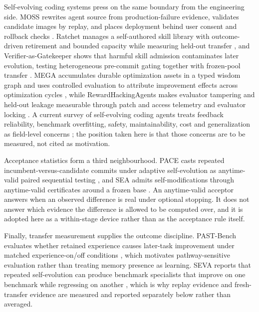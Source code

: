 Self-evolving coding systems press on the same boundary from the engineering side. MOSS rewrites agent source from production-failure evidence, validates candidate images by replay, and places deployment behind user consent and rollback checks \cite{moss2026}. Ratchet manages a self-authored skill library with outcome-driven retirement and bounded capacity while measuring held-out transfer \cite{ratchet2026}, and Verifier-as-Gatekeeper shows that harmful skill admission contaminates later evolution, testing heterogeneous pre-commit gating together with frozen-pool transfer \cite{vag2026}. MEGA accumulates durable optimization assets in a typed wisdom graph and uses controlled evaluation to attribute improvement effects across optimization cycles \cite{mega2026}, while RewardHackingAgents makes evaluator tampering and held-out leakage measurable through patch and access telemetry and evaluator locking \cite{rewardhackingagents2026}. A current survey of self-evolving coding agents treats feedback reliability, benchmark overfitting, safety, maintainability, cost and generalization as field-level concerns \cite{selfevolvingcoding2026}; the position taken here is that those concerns are to be measured, not cited as motivation.

Acceptance statistics form a third neighbourhood. PACE casts repeated incumbent-versus-candidate commits under adaptive self-evolution as anytime-valid paired sequential testing \cite{paceacceptance2026}, and SEA admits self-modifications through anytime-valid certificates around a frozen base \cite{sea2026}. An anytime-valid acceptor answers when an observed difference is real under optional stopping. It does not answer which evidence the difference is allowed to be computed over, and it is adopted here as a within-stage device rather than as the acceptance rule itself.

Finally, transfer measurement supplies the outcome discipline. PAST-Bench evaluates whether retained experience causes later-task improvement under matched experience-on/off conditions \cite{pastbench2026}, which motivates pathway-sensitive evaluation rather than treating memory presence as learning. SEVA reports that repeated self-evolution can produce benchmark specialists that improve on one benchmark while regressing on another \cite{seva2026}, which is why replay evidence and fresh-transfer evidence are measured and reported separately below rather than averaged.


